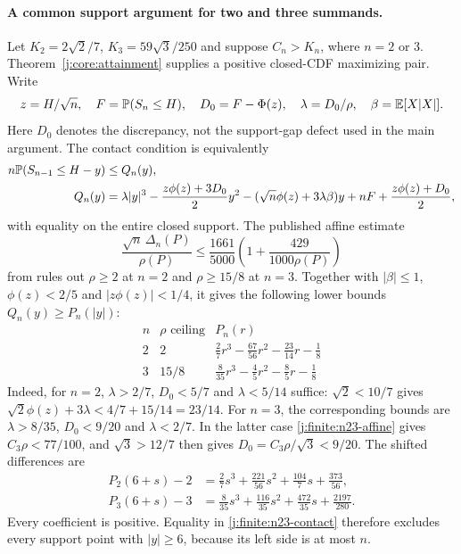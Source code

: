 \paragraph{A common support argument for two and three summands.}
Let $K_2=2\sqrt2/7$, $K_3=59\sqrt3/250$ and suppose $C_n>K_n$,
where $n=2$ or $3$.  Theorem~\ref{j:core:attainment} supplies a
positive closed-CDF maximizing pair.  Write
\[
 z=H/\sqrt n,\quad F=\mathbb P(S_n\le H),\quad D_0=F-\Phi(z),
 \quad \lambda=D_0/\rho,\quad \beta=\mathbb E[X|X|].
\]
Here $D_0$ denotes the discrepancy, not the support-gap defect used in
the main argument.  The contact condition is equivalently
\begin{align}
 n\mathbb P(S_{n-1}\le H-y)&\le Q_n(y),\notag\\
 Q_n(y)&=\lambda|y|^3-\frac{z\phi(z)+3D_0}{2}y^2
 -(\sqrt n\phi(z)+3\lambda\beta)y
 +nF+\frac{z\phi(z)+D_0}{2},\label{j:finite:n23-contact}
\end{align}
with equality on the entire closed support.
The published affine estimate
\begin{equation}\label{j:finite:n23-affine}
 \frac{\sqrt n\,\Delta_n(P)}{\rho(P)}\le\frac{1661}{5000}
       \left(1+\frac{429}{1000\rho(P)}\right)
\end{equation}
from \citet{Shevtsova2013} rules out $\rho\ge2$ at $n=2$ and
$\rho\ge15/8$ at $n=3$.  Together with $|\beta|\le1$,
$\phi(z)<2/5$ and $|z\phi(z)|<1/4$, it gives the following lower
bounds $Q_n(y)\ge P_n(|y|)$:
\begingroup\renewcommand{\arraystretch}{1.8}
\[
\begin{array}{c|c|c}
 n&\rho\text{ ceiling}&P_n(r)\\\hline
 2&2&\displaystyle\frac27r^3-\frac{67}{56}r^2-\frac{23}{14}r-\frac18\\[2pt]
 3&15/8&\displaystyle\frac8{35}r^3-\frac45r^2-\frac85r-\frac18
\end{array}
\]
\endgroup
Indeed, for $n=2$, $\lambda>2/7$, $D_0<5/7$ and
$\lambda<5/14$ suffice: $\sqrt2<10/7$ gives
$\sqrt2\phi(z)+3\lambda<4/7+15/14=23/14$.
For $n=3$, the corresponding bounds are
$\lambda>8/35$, $D_0<9/20$ and $\lambda<2/7$.
In the latter case \eqref{j:finite:n23-affine} gives $C_3\rho<77/100$,
and $\sqrt3>12/7$ then gives $D_0=C_3\rho/\sqrt3<9/20$.
The shifted differences are
\begin{align*}
 P_2(6+s)-2&=\frac27s^3+\frac{221}{56}s^2+
                  \frac{104}{7}s+\frac{373}{56},\\
 P_3(6+s)-3&=\frac8{35}s^3+\frac{116}{35}s^2+
                  \frac{472}{35}s+\frac{2197}{280}.
\end{align*}
Every coefficient is positive.  Equality in
\eqref{j:finite:n23-contact} therefore excludes every support point with
$|y|\ge6$, because its left side is at most $n$.


